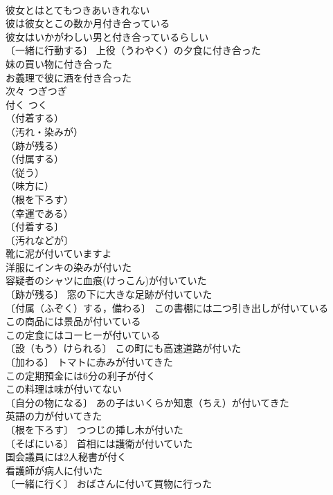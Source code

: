\documentclass[8pt]{extreport}
\begin{document}
\begin{CJK}{UTF8}{min}
\\	彼女とはとてもつきあいきれない 
\\	彼は彼女とこの数か月付き合っている 
\\	彼女はいかがわしい男と付き合っているらしい 
\\	〔一緒に行動する〕 上役（うわやく）の夕食に付き合った 
\\	妹の買い物に付き合った 
\\	お義理で彼に酒を付き合った 
\\	次々	つぎつぎ	
\\	付く	つく	
\\	（付着する）
\\	（汚れ・染みが）
\\	（跡が残る）
\\	（付属する）
\\	（従う）
\\	（味方に）
\\	（根を下ろす）
\\	（幸運である）
\\	〔付着する〕
\\	〔汚れなどが〕
\\	靴に泥が付いていますよ 
\\	洋服にインキの染みが付いた 
\\	容疑者のシャツに血痕(けっこん)が付いていた 
\\	〔跡が残る〕 窓の下に大きな足跡が付いていた 
\\	〔付属（ふぞく）する，備わる〕 この書棚には二つ引き出しが付いている 
\\	この商品には景品が付いている 
\\	この定食にはコーヒーが付いている 
\\	〔設（もう）けられる〕 この町にも高速道路が付いた 
\\	〔加わる〕 トマトに赤みが付いてきた 
\\	この定期預金には6分の利子が付く 
\\	この料理は味が付いてない 
\\	〔自分の物になる〕 あの子はいくらか知恵（ちえ）が付いてきた 
\\	英語の力が付いてきた 
\\	〔根を下ろす〕 つつじの挿し木が付いた 
\\	〔そばにいる〕 首相には護衛が付いていた 
\\	国会議員には2人秘書が付く 
\\	看護師が病人に付いた 
\\	〔一緒に行く〕 おばさんに付いて買物に行った 

\end{CJK}
\end{document}
